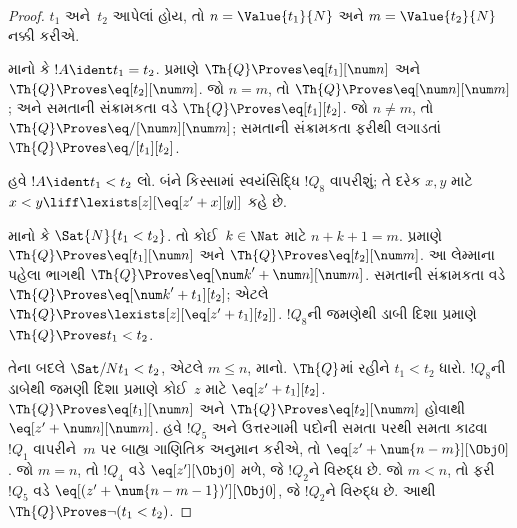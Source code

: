 \begin{proof}
$t_1$ અને~$t_2$ આપેલાં હોય,
તો $n = \Value{t_1}{N}$ અને
$m = \Value{t_2}{N}$ નક્કી કરીએ.

માનો કે $!A \ident t_1 = t_2$.
પ્રમાણે $\Th{Q} \Proves
\eq[t_1][\num n]$ અને
$\Th{Q} \Proves \eq[t_2][\num m]$.
જો $n = m$, તો
$\Th{Q} \Proves \eq[\num n][\num m]$;
અને સમતાની સંક્રામકતા વડે
$\Th{Q} \Proves \eq[t_1][t_2]$.
જો $n \neq m$, તો
$\Th{Q} \Proves \eq/[\num n][\num m]$;
સમતાની સંક્રામકતા ફરીથી
લગાડતાં $\Th{Q} \Proves
\eq/[t_1][t_2]$.

હવે $!A \ident t_1 < t_2$
લો. બંને કિસ્સામાં સ્વયંસિદ્ધિ
$!Q_8$ વાપરીશું; તે દરેક
$x,y$ માટે
$x < y \liff
\lexists[z][\eq[z' + x][y]]$
કહે છે.

માનો કે $\Sat{N}{t_1 < t_2}$.
તો કોઈ~$k \in \Nat$ માટે
$n + k + 1 = m$.
પ્રમાણે $\Th{Q} \Proves
\eq[t_1][\num n]$ અને
$\Th{Q} \Proves \eq[t_2][\num m]$.
આ લેમ્માના પહેલા ભાગથી
$\Th{Q} \Proves
\eq[{\num k}' + \num n][\num m]$.
સમતાની સંક્રામકતા વડે
$\Th{Q} \Proves
\eq[{\num k}' + t_1][t_2]$;
એટલે $\Th{Q} \Proves
\lexists[z][\eq[z' + t_1][t_2]]$.
$!Q_8$ની જમણેથી ડાબી
દિશા પ્રમાણે $\Th{Q} \Proves
t_1 < t_2$.

તેના બદલે $\Sat/{N}{t_1 < t_2}$,
એટલે $m \leq n$, માનો.
$\Th{Q}$માં રહીને
$t_1 < t_2$ ધારો. $!Q_8$ની
ડાબેથી જમણી દિશા પ્રમાણે
કોઈ~$z$ માટે
$\eq[z' + t_1][t_2]$.
$\Th{Q} \Proves
\eq[t_1][\num n]$ અને
$\Th{Q} \Proves \eq[t_2][\num m]$
હોવાથી
$\eq[z' + \num n][\num m]$.
હવે $!Q_5$ અને ઉત્તરગામી પદોની સમતા પરથી
સમતા કાઢવા $!Q_1$ વાપરીને~$m$
પર બાહ્ય ગાણિતિક અનુમાન કરીએ, તો
$\eq[z' + \num{n - m}][\Obj 0]$.
જો $m = n$, તો $!Q_4$
વડે $\eq[z'][\Obj 0]$ મળે,
જે $!Q_2$ને વિરુદ્ધ છે.
જો $m < n$, તો ફરી~$!Q_5$
વડે
$\eq[(z' + \num{n - m - 1})'][\Obj 0]$,
જે $!Q_2$ને વિરુદ્ધ છે.
આથી $\Th{Q} \Proves
\lnot(t_1 < t_2)$.
\end{proof}

